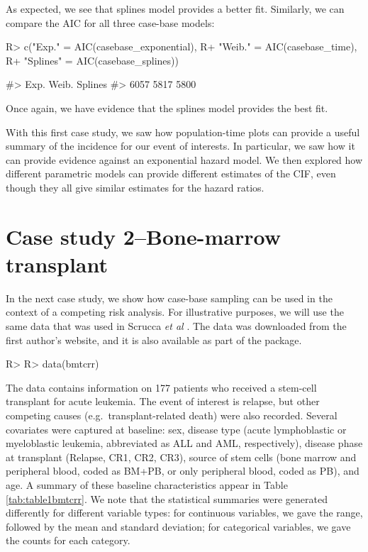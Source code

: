 \documentclass[
]{jss}
\begin{document}
As expected, we see that splines model provides a better fit. Similarly,
we can compare the AIC for all three case-base models:

\begin{CodeChunk}

\begin{CodeInput}
R> c("Exp." = AIC(casebase_exponential),
R+   "Weib." = AIC(casebase_time),
R+   "Splines" = AIC(casebase_splines))
\end{CodeInput}

\begin{CodeOutput}
#>    Exp.   Weib. Splines 
#>    6057    5817    5800
\end{CodeOutput}
\end{CodeChunk}

Once again, we have evidence that the splines model provides the best
fit.

With this first case study, we saw how population-time plots can provide
a useful summary of the incidence for our event of interests. In
particular, we saw how it can provide evidence against an exponential
hazard model. We then explored how different parametric models can
provide different estimates of the CIF, even though they all give
similar estimates for the hazard ratios.

\hypertarget{case-study-2bone-marrow-transplant}{%
\section{Case study 2--Bone-marrow
transplant}\label{case-study-2bone-marrow-transplant}}

In the next case study, we show how case-base sampling can be used in
the context of a competing risk analysis. For illustrative purposes, we
will use the same data that was used in Scrucca \emph{et al}
\citeyearpar{scrucca2010regression}. The data was downloaded from the
first author's website, and it is also available as part of the
 package.

\begin{CodeChunk}

\begin{CodeInput}
R> 
R> data(bmtcrr)
\end{CodeInput}
\end{CodeChunk}

The data contains information on 177 patients who received a stem-cell
transplant for acute leukemia. The event of interest is relapse, but
other competing causes (e.g.~transplant-related death) were also
recorded. Several covariates were captured at baseline: sex, disease
type (acute lymphoblastic or myeloblastic leukemia, abbreviated as ALL
and AML, respectively), disease phase at transplant (Relapse, CR1, CR2,
CR3), source of stem cells (bone marrow and peripheral blood, coded as
BM+PB, or only peripheral blood, coded as PB), and age. A summary of
these baseline characteristics appear in Table \ref{tab:table1bmtcrr}.
We note that the statistical summaries were generated differently for
different variable types: for continuous variables, we gave the range,
followed by the mean and standard deviation; for categorical variables,
we gave the counts for each category.
\end{document}
